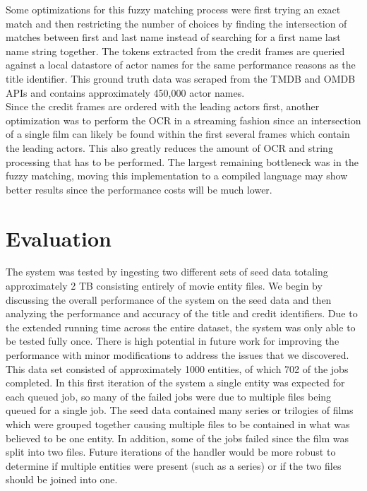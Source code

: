 \documentclass[paper=a4, fontsize=11pt]{scrartcl} %
\numberwithin{equation}{section} %
\numberwithin{figure}{section} %
\numberwithin{table}{section} %
\begin{document}
Some optimizations for this fuzzy matching process were first trying an exact match and then restricting the number of choices by finding the intersection of matches between first and last name instead of searching for a first name last name string together. The tokens extracted from the credit frames are queried against a local datastore of actor names for the same performance reasons as the title identifier. This ground truth data was scraped from the TMDB and OMDB APIs and contains approximately 450,000 actor names. \\

Since the credit frames are ordered with the leading actors first, another optimization was to perform the OCR in a streaming fashion since an intersection of a single film can likely be found within the first several frames which contain the leading actors. This also greatly reduces the amount of OCR and string processing that has to be performed. The largest remaining bottleneck was in the fuzzy matching, moving this implementation to a compiled language may show better results since the performance costs will be much lower. \\

\section{Evaluation}
\label{sec:evaluation}

The system was tested by ingesting two different sets of seed data totaling approximately 2 TB consisting entirely of movie entity files. We begin by discussing the overall performance of the system on the seed data and then analyzing the performance and accuracy of the title and credit identifiers. Due to the extended running time across the entire dataset, the system was only able to be tested fully once. There is high potential in future work for improving the performance with minor modifications to address the issues that we discovered. \\

This data set consisted of approximately 1000 entities, of which 702 of the jobs completed. In this first iteration of the system a single entity was expected for each queued job, so many of the failed jobs were due to multiple files being queued for a single job. The seed data contained many series or trilogies of films which were grouped together causing multiple files to be contained in what was believed to be one entity. In addition, some of the jobs failed since the film was split into two files. Future iterations of the handler would be more robust to determine if multiple entities were present (such as a series) or if the two files should be joined into one. \\
\end{document}
